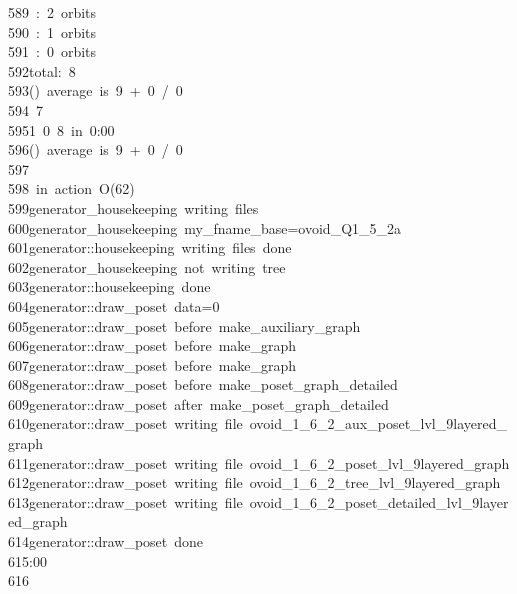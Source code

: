 \begin{tabbing}
589\ :\ 2\ orbits\\[0pt]
590\ :\ 1\ orbits\\[0pt]
591\ :\ 0\ orbits\\[0pt]
592\>total:\ 8\\[0pt]
593\>()\ average\ is\ 9\ +\ 0\ /\ 0\\[0pt]
594\>\ 7\\[0pt]
595\>1\ 0\ 8\ in\ 0:00\\[0pt]
596\>()\ average\ is\ 9\ +\ 0\ /\ 0\\[0pt]
597\>\\[0pt]
598\>\ in\ action\ O(62)\\[0pt]
599\>generator\_housekeeping\ writing\ files\\[0pt]
600\>generator\_housekeeping\ my\_fname\_base=ovoid\_Q1\_5\_2a\\[0pt]
601\>generator::housekeeping\ writing\ files\ done\\[0pt]
602\>generator\_housekeeping\ not\ writing\ tree\\[0pt]
603\>generator::housekeeping\ done\\[0pt]
604\>generator::draw\_poset\ data=0\\[0pt]
605\>generator::draw\_poset\ before\ make\_auxiliary\_graph\\[0pt]
606\>generator::draw\_poset\ before\ make\_graph\\[0pt]
607\>generator::draw\_poset\ before\ make\_graph\\[0pt]
608\>generator::draw\_poset\ before\ make\_poset\_graph\_detailed\\[0pt]
609\>generator::draw\_poset\ after\ make\_poset\_graph\_detailed\\[0pt]
610\>generator::draw\_poset\ writing\ file\ ovoid\_1\_6\_2\_aux\_poset\_lvl\_9layered\_graph\\[0pt]
611\>generator::draw\_poset\ writing\ file\ ovoid\_1\_6\_2\_poset\_lvl\_9layered\_graph\\[0pt]
612\>generator::draw\_poset\ writing\ file\ ovoid\_1\_6\_2\_tree\_lvl\_9layered\_graph\\[0pt]
613\>generator::draw\_poset\ writing\ file\ ovoid\_1\_6\_2\_poset\_detailed\_lvl\_9layered\_graph\\[0pt]
614\>generator::draw\_poset\ done\\[0pt]
615:00\\[0pt]
616\>\end{tabbing}
